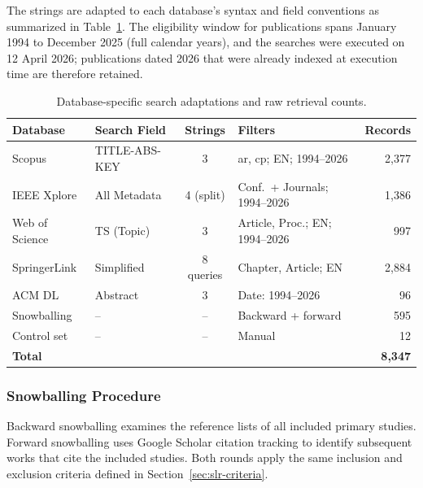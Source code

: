 The strings are adapted to each database's syntax and field conventions as
summarized in Table~\ref{tab:db-adaptations}. The eligibility window for
publications spans January 1994 to December 2025 (full calendar years),
and the searches were executed on 12 April 2026;
publications dated 2026 that were already indexed at execution time are
therefore retained.

\begin{table}[htbp]
\centering
\caption{Database-specific search adaptations and raw retrieval counts.}
\label{tab:db-adaptations}
\small
\setlength{\tabcolsep}{4pt}
\begin{tabular}{p{2.6cm} p{2.6cm} c p{5.0cm} r}
\toprule
\textbf{Database} & \textbf{Search Field} & \textbf{Strings} & \textbf{Filters} & \textbf{Records} \\
\midrule
Scopus         & TITLE-ABS-KEY & 3         & ar, cp; EN; 1994--2026                 & 2{,}377 \\
IEEE Xplore    & All Metadata  & 4 (split) & Conf.\ + Journals; 1994--2026          & 1{,}386 \\
Web of Science & TS (Topic)    & 3         & Article, Proc.; EN; 1994--2026         & 997 \\
SpringerLink   & Simplified    & 8 queries & Chapter, Article; EN                   & 2{,}884 \\
ACM DL         & Abstract      & 3         & Date: 1994--2026                       & 96 \\
Snowballing    & --            & --        & Backward + forward                     & 595 \\
Control set    & --            & --        & Manual                                 & 12 \\
\midrule
\textbf{Total} &  &  &  & \textbf{8{,}347} \\
\bottomrule
\end{tabular}
\end{table}

\subsubsection{Snowballing Procedure}

Backward snowballing examines the reference lists of all included primary
studies. Forward snowballing uses Google Scholar citation tracking to identify
subsequent works that cite the included studies. Both rounds apply the same
inclusion and exclusion criteria defined in Section~\ref{sec:slr-criteria}.


